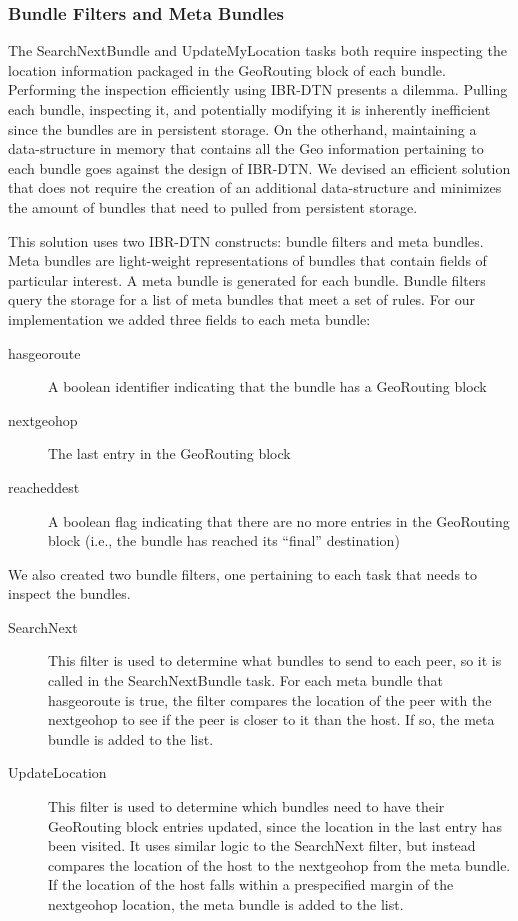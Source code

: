 \subsubsection{Bundle Filters and Meta Bundles}

The SearchNextBundle and UpdateMyLocation tasks both require inspecting the location information packaged in the GeoRouting block of each bundle. Performing the inspection efficiently using IBR-DTN presents a dilemma. Pulling each bundle, inspecting it, and potentially modifying it is inherently inefficient since the bundles are in persistent storage. On the otherhand, maintaining a data-structure in memory that contains all the Geo information pertaining to each bundle goes against the design of IBR-DTN. We devised an efficient solution that does not require the creation of an additional data-structure and minimizes the amount of bundles that need to pulled from persistent storage.

This solution uses two IBR-DTN constructs: {\sc bundle filters} and {\sc meta bundles}. {\sc Meta bundles} are light-weight representations of bundles that contain fields of particular interest. A meta bundle is generated for each bundle. {\sc Bundle filters} query the storage for a list of meta bundles that meet a set of rules. For our implementation we added three fields to each {\sc meta bundle}:

\begin{description}
\item[hasgeoroute] A boolean identifier indicating that the bundle has a {\sc GeoRouting} block
\item[nextgeohop] The last entry in the {\sc GeoRouting} block
\item[reacheddest] A boolean flag indicating that there are no more entries in the {\sc GeoRouting} block (i.e., the bundle has reached its ``final'' destination)
\end{description}

We also created two {\sc bundle filters}, one pertaining to each task that needs to inspect the bundles.

\begin{description}
\item[SearchNext] This filter is used to determine what bundles to send to each peer, so it is called in the {\sc SearchNextBundle} task. For each {\sc meta bundle} that {\sc hasgeoroute} is {\sc true}, the filter compares the location of the peer with the {\sc nextgeohop} to see if the peer is closer to it than the host. If so, the meta bundle is added to the list.
\item[UpdateLocation] This filter is used to determine which bundles need to have their {\sc GeoRouting} block entries updated, since the location in the last entry has been visited. It uses similar logic to the {\sc SearchNext} filter, but instead compares the location of the host to the {\sc nextgeohop} from the meta bundle. If the location of the host falls within a prespecified margin of the {\sc nextgeohop} location, the meta bundle is added to the list.
\end{description}

